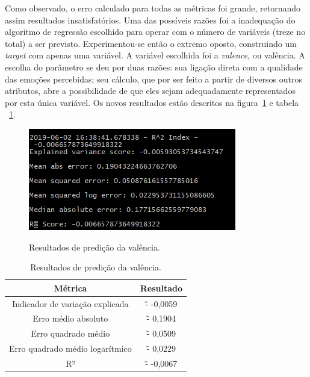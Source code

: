 Como observado, o erro calculado para todas as métricas foi grande, retornando assim resultados insatisfatórios. Uma das possíveis razões foi a inadequação do algoritmo de regressão escolhido para operar com o número de variáveis (treze no total) a ser previsto. Experimentou-se então o extremo oposto, construindo um \textit{target} com apenas uma variável. A variável escolhida foi a \textit{valence}, ou valência. A escolha do parâmetro se deu por duas razões: sua ligação direta com a qualidade das emoções percebidas; seu cálculo, que por ser feito a partir de diversos outros atributos, abre a possibilidade de que eles sejam adequadamente representados por esta única variável. Os novos resultados estão descritos na figura~\ref{f.params_valence_feature} e tabela ~\ref{t.params_valence_feature}.

\begin{figure}[H]
\caption{Resultados de predição da valência.}
\centering
\includegraphics[width=\textwidth,height=\textheight,keepaspectratio]{../figs/params_valence_feature.PNG}
\label{f.params_valence_feature}
\end{figure}

\begin{table}[H]
\centering
\begin{tabular}{c|c}
\hline
\textbf{Métrica} & \textbf{Resultado}\\\hline \hline
{Indicador de variação explicada} & {\~- -0,0059}\\\hline
{Erro médio absoluto} & {\~- 0,1904}\\\hline
{Erro quadrado médio} & {\~- 0,0509}\\\hline
{Erro quadrado médio logarítmico} & {\~- 0,0229}\\\hline
{R²} & {\~- -0,0067}\\\hline
\end{tabular}
\caption{Resultados de predição da valência.} \label{t.params_valence_feature}
\end{table}

